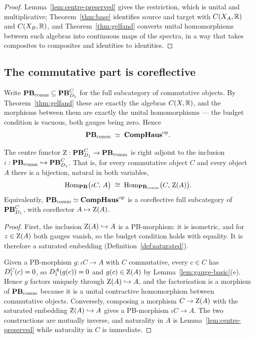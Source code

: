 \begin{proof}
Lemma~\ref{lem:centre-preserved} gives the restriction, which is unital and
multiplicative; Theorem~\ref{thm:base} identifies source and target with
$C(X_A,\mathbb{R})$ and $C(X_B,\mathbb{R})$, and Theorem~\ref{thm:gelfand} converts unital
homomorphisms between such algebras into continuous maps of the spectra, in a
way that takes composites to composites and identities to identities.
\end{proof}

\subsection{The commutative part is coreflective}

Write $\mathbf{PB}_{\mathrm{comm}}\subseteq\mathbf{PB}^C_{D_1}$ for the full subcategory of
commutative objects.  By Theorem~\ref{thm:gelfand} these are exactly the
algebras $C(X,\mathbb{R})$, and the morphisms between them are exactly the unital
homomorphisms --- the budget condition is vacuous, both gauges being zero.
Hence
\[
  \mathbf{PB}_{\mathrm{comm}}\;\simeq\;\mathbf{CompHaus}^{\mathrm{op}} .
\]

\begin{theorem}[Coreflection]\label{thm:coreflection}
The centre functor $\operatorname{Z}:\mathbf{PB}^C_{D_1}\to\mathbf{PB}_{\mathrm{comm}}$ is right adjoint to the
inclusion $\iota:\mathbf{PB}_{\mathrm{comm}}\hookrightarrow\mathbf{PB}^C_{D_1}$.  That is, for every
commutative object $C$ and every object $A$ there is a bijection, natural in
both variables,
\[
  \operatorname{Hom}_{\mathbf{PB}}\bigl(\iota C,\,A\bigr)\;\cong\;\operatorname{Hom}_{\mathbf{PB}_{\mathrm{comm}}}\bigl(C,\,\operatorname{Z}(A)\bigr).
\]
Equivalently, $\mathbf{PB}_{\mathrm{comm}}\simeq\mathbf{CompHaus}^{\mathrm{op}}$ is a coreflective full subcategory of
$\mathbf{PB}^C_{D_1}$, with coreflector $A\mapsto\operatorname{Z}(A)$.
\end{theorem}

\begin{proof}
First, the inclusion $\operatorname{Z}(A)\hookrightarrow A$ is a PB-morphism: it is
isometric, and for $z\in\operatorname{Z}(A)$ both gauges vanish, so the budget condition
holds with equality.  It is therefore a saturated embedding
(Definition~\ref{def:saturated}).

Given a PB-morphism $g:\iota C\to A$ with $C$ commutative, every $c\in C$ has
$D_1^C(c)=0$, so $D_1^A(g(c))=0$ and $g(c)\in\operatorname{Z}(A)$ by
Lemma~\ref{lem:gauge-basic}(e).  Hence $g$ factors uniquely through
$\operatorname{Z}(A)\hookrightarrow A$, and the factorisation is a morphism of $\mathbf{PB}_{\mathrm{comm}}$
because it is a unital contractive homomorphism between commutative objects.
Conversely, composing a morphism $C\to\operatorname{Z}(A)$ with the saturated embedding
$\operatorname{Z}(A)\hookrightarrow A$ gives a PB-morphism $\iota C\to A$.  The two
constructions are mutually inverse, and naturality in $A$ is
Lemma~\ref{lem:centre-preserved} while naturality in $C$ is immediate.
\end{proof}

